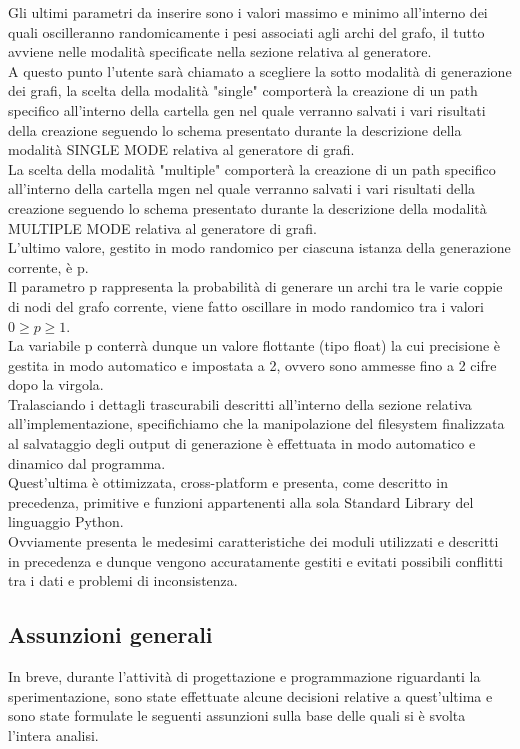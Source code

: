 Gli ultimi parametri da inserire sono i valori massimo e minimo all'interno dei quali oscilleranno randomicamente i pesi associati agli archi del grafo, il tutto avviene nelle modalità specificate nella sezione relativa al generatore.\\

A questo punto l'utente sarà chiamato a scegliere la sotto modalità di generazione dei grafi, la scelta della modalità "single" comporterà la creazione di un path specifico all'interno della cartella gen nel quale verranno salvati i vari risultati della creazione seguendo lo schema presentato durante la descrizione della modalità SINGLE MODE relativa al generatore di grafi.\\
La scelta della modalità "multiple" comporterà la creazione di un path specifico all'interno della cartella mgen nel quale verranno salvati i vari risultati della creazione seguendo lo schema presentato durante la descrizione della modalità MULTIPLE MODE relativa al generatore di grafi. \\

L'ultimo valore, gestito in modo randomico per ciascuna istanza della generazione corrente, è p.\\
Il parametro p rappresenta la probabilità di generare un archi tra le varie coppie di nodi del grafo corrente, viene fatto oscillare in modo randomico tra i valori \(0 \geq p \geq 1\).\\
La variabile p conterrà dunque un valore flottante (tipo float) la cui precisione è gestita in modo automatico e impostata a 2, ovvero sono ammesse fino a 2 cifre dopo la virgola.\\

Tralasciando i dettagli trascurabili descritti all'interno della sezione relativa all'implementazione, specifichiamo che la manipolazione del filesystem finalizzata al salvataggio degli output di generazione è effettuata in modo automatico e dinamico dal programma.\\
Quest'ultima è ottimizzata, cross-platform e presenta, come descritto in precedenza, primitive e funzioni appartenenti alla sola Standard Library del linguaggio Python.\\
Ovviamente presenta le medesimi caratteristiche dei moduli utilizzati e descritti in precedenza e dunque vengono accuratamente gestiti e evitati possibili conflitti tra i dati e problemi di inconsistenza.\\

\subsection{Assunzioni generali}
\justify
In breve, durante l'attività di progettazione e programmazione riguardanti la sperimentazione, sono state effettuate alcune decisioni relative a quest'ultima e sono state formulate le seguenti assunzioni sulla base delle quali si è svolta l'intera analisi.\\


